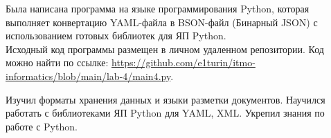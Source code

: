 \label{main4}
Была написана программа на языке программирования Python, которая выполняет конвертацию YAML-файла в BSON-файл (Бинарный JSON) с использованием готовых библиотек для ЯП Python.\\

Исходный код программы размещен в личном удаленном репозитории. Код можно найти по ссылке: \url{https://github.com/e1turin/itmo-informatics/blob/main/lab-4/main4.py}.\\ 



Изучил форматы хранения данных и языки разметки документов. Научился работать с библиотеками ЯП Python для YAML, XML. Укрепил знания по работе с Python.\\
\newpage






